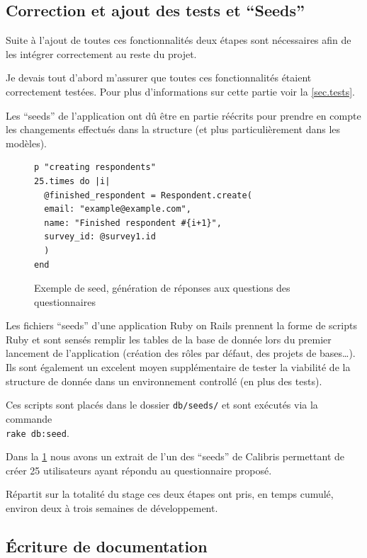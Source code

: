 \documentclass[12pt,a4paper]{book}
\begin{document}
\subsection{Correction et ajout des tests et ``Seeds''}

Suite à l'ajout de toutes ces fonctionnalités deux étapes sont nécessaires afin de les intégrer correctement au reste du projet.

Je devais tout d'abord m'assurer que toutes ces fonctionnalités étaient correctement testées. Pour plus d'informations sur cette partie voir la \cref{sec.tests}.

Les ``seeds'' de l'application ont dû être en partie réécrits pour prendre en compte les changements effectués dans la structure (et plus particulièrement dans les modèles).

  \begin{figure}[h]
  \lstset{language=ruby}
  \begin{lstlisting}
p "creating respondents"
25.times do |i|
  @finished_respondent = Respondent.create(
  email: "example@example.com",
  name: "Finished respondent #{i+1}",
  survey_id: @survey1.id
  )
end
  \end{lstlisting}
   \caption{Exemple de seed, génération de réponses aux questions des questionnaires}
  \label{fig.seeds}
  \end{figure}

Les fichiers ``seeds'' d'une application Ruby on Rails prennent la forme de scripts Ruby et sont sensés remplir les tables de la base de donnée lors du premier lancement de l'application (création des rôles par défaut, des projets de bases…). Ils sont également un excelent moyen supplémentaire de tester la viabilité de la structure de donnée dans un environnement controllé (en plus des tests).

Ces scripts sont placés dans le dossier \texttt{db/seeds/} et sont exécutés via la commande \\
\texttt{rake db:seed}.

Dans la \cref{fig.seeds} nous avons un extrait de l'un des ``seeds'' de Calibris permettant de créer 25 utilisateurs ayant répondu au questionnaire proposé. 

Répartit sur la totalité du stage ces deux étapes ont pris, en temps cumulé, environ deux à trois semaines de développement.

\subsection{Écriture de documentation}
\end{document}
